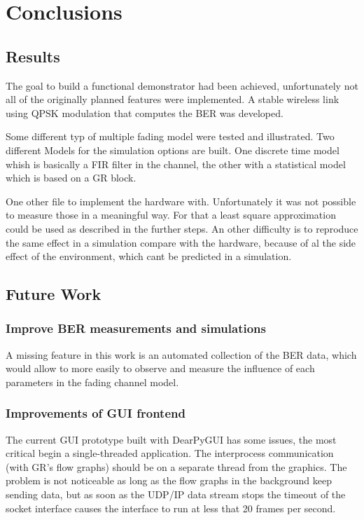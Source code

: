
\chapter{Conclusions} \label{chp:conclusions}

\section{Results}

The goal to build a functional demonstrator had been achieved, unfortunately not all of the originally planned features were implemented. A stable wireless link using QPSK modulation that computes the BER was developed.

Some different typ of multiple fading model were tested and illustrated.
Two different Models for the simulation options are built. One discrete time model whish is  basically a FIR filter in the channel, the other with a statistical model which is based on a GR block.

One other file to implement the hardware with. Unfortunately it was not possible to measure those in a meaningful way. For that a least square approximation could be used as described in the further steps. An other difficulty is to reproduce the same effect in a simulation compare with the hardware, because of al the side effect of the environment, which cant be predicted in a simulation.


\section{Future Work}

\subsection{Improve BER measurements and simulations}

A missing feature in this work is an automated collection of the BER data, which would allow to more easily to observe and measure the influence of each parameters in the fading channel model.

\subsection{Improvements of GUI frontend}

The current GUI prototype built with DearPyGUI has some issues, the most critical begin a single-threaded application. The interprocess communication (with GR's flow graphs) should be on a separate thread from the graphics. The problem is not noticeable as long as the flow graphs in the background keep sending data, but as soon as the UDP/IP data stream stops the timeout of the socket interface causes the interface to run at less that 20 frames per second.

